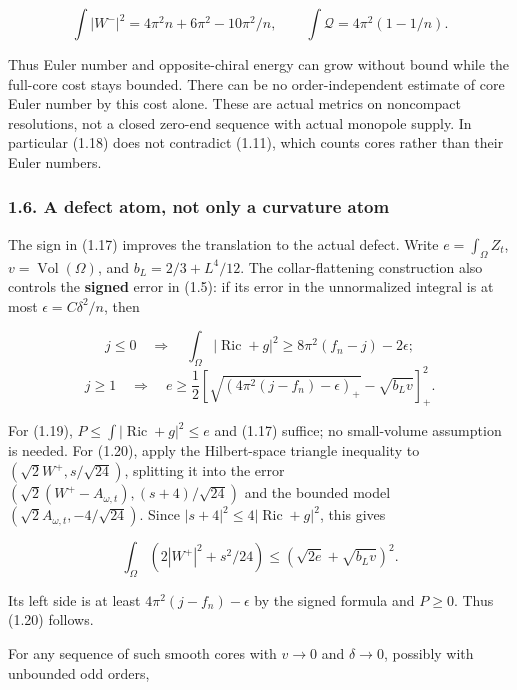\documentclass[
  10pt,
]{article}
\begin{document}
\[
 \int|W^-|^2=4\pi^2n+6\pi^2-10\pi^2/n,
 \qquad \int\mathscr Q=4\pi^2(1-1/n).
                                                        \tag{1.18}
\]

Thus Euler number and opposite-chiral energy can grow without bound
while the full-core cost stays bounded. There can be no
order-independent estimate of core Euler number by this cost alone.
These are actual metrics on noncompact resolutions, not a closed
zero-end sequence with actual monopole supply. In particular (1.18) does
not contradict (1.11), which counts cores rather than their Euler
numbers.

\hypertarget{a-defect-atom-not-only-a-curvature-atom}{%
\subsubsection{1.6. A defect atom, not only a curvature
atom}\label{a-defect-atom-not-only-a-curvature-atom}}

The sign in (1.17) improves the translation to the actual defect. Write
\(e=\int_\Omega Z_t\), \(v=\operatorname{Vol}(\Omega)\), and
\(b_L=2/3+L^4/12\). The collar-flattening construction also controls the
\textbf{signed} error in (1.5): if its error in the unnormalized
integral is at most \(\epsilon=C\delta^2/n\), then

\[
 j\le0\quad\Longrightarrow\quad
 \int_\Omega|\operatorname{Ric}+g|^2
              \ge8\pi^2(f_n-j)-2\epsilon;                       \tag{1.19}
\] \[
 j\ge1\quad\Longrightarrow\quad
 e\ge\frac12\left[
       \sqrt{(4\pi^2(j-f_n)-\epsilon)_+}-\sqrt{b_Lv}
                         \right]_+^2.                          \tag{1.20}
\]

For (1.19), \(P\le\int|\operatorname{Ric}+g|^2\le e\) and (1.17)
suffice; no small-volume assumption is needed. For (1.20), apply the
Hilbert-space triangle inequality to \((\sqrt2W^+,s/\sqrt{24})\),
splitting it into the error
\((\sqrt2(W^+-A_{\omega,t}),(s+4)/\sqrt{24})\) and the bounded model
\((\sqrt2A_{\omega,t},-4/\sqrt{24})\). Since
\(|s+4|^2\le4|\operatorname{Ric}+g|^2\), this gives

\[
 \int_\Omega(2|W^+|^2+s^2/24)
                 \le(\sqrt{2e}+\sqrt{b_Lv})^2.
\]

Its left side is at least \(4\pi^2(j-f_n)-\epsilon\) by the signed
formula and \(P\ge0\). Thus (1.20) follows.

For any sequence of such smooth cores with \(v\to0\) and \(\delta\to0\),
possibly with unbounded odd orders,
\end{document}
